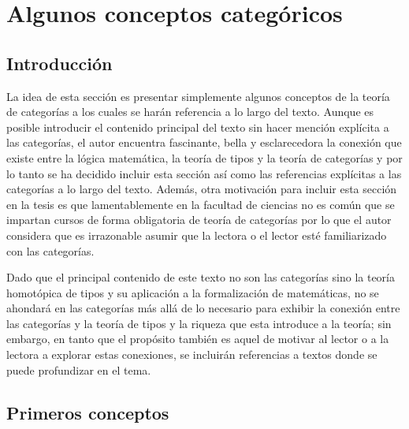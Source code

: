 \documentclass{article}
\begin{document}
\section{Algunos conceptos categóricos}
\subsection{Introducción}
La idea de esta sección es presentar simplemente algunos conceptos de la teoría
de categorías a los cuales se harán referencia a lo largo del texto. Aunque es
posible introducir el contenido principal del texto sin hacer mención explícita 
a las categorías, el autor encuentra fascinante, bella y esclarecedora la 
conexión que existe entre la lógica matemática, la teoría de tipos y la teoría 
de categorías y por lo tanto se ha decidido incluir esta sección así como las
referencias explícitas a las categorías a lo largo del texto. Además, otra
motivación para incluir esta sección en la tesis es que lamentablemente en la
facultad de ciencias no es común que se impartan cursos de forma obligatoria de
teoría de categorías por lo que el autor considera que es irrazonable asumir que
la lectora o el lector esté familiarizado con las categorías.

Dado que el principal contenido de este texto no son las categorías sino la
teoría homotópica de tipos y su aplicación a la formalización de matemáticas,
no se ahondará en las categorías más allá de lo necesario para exhibir la
conexión entre las categorías y la teoría de tipos y la riqueza que esta
introduce a la teoría; sin embargo, en tanto que el propósito también es aquel
de motivar al lector o a la lectora a explorar estas conexiones, se incluirán
referencias a textos donde se puede profundizar en el tema.

\subsection{Primeros conceptos}
\end{document}
